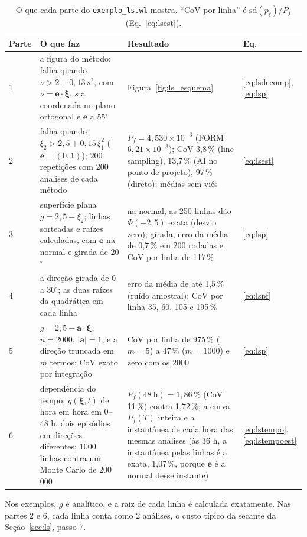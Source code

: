 \documentclass[11pt,a4paper]{article}
\newcommand{\xib}{\bm\xi}
\begin{document}
\begin{table}[H]\centering\small
\caption{O que cada parte do \texttt{exemplo\_ls.wl} mostra. ``CoV por linha'' é $\mathrm{sd}(p_\ell)/P_f$
(Eq.~\ref{eq:lsest}).}\label{tab:exls}
\begin{tabular}{p{}p{}p{}p{}}
\toprule
Parte & O que faz & Resultado & Eq. \\
\midrule
1 & a figura do método: falha quando $\nu > 2 + 0{,}13\,s^2$, com $\nu = \bm e\cdot\xib$, $s$ a coordenada no plano
  ortogonal e $\bm e$ a 55$^\circ$ & Figura~\ref{fig:ls_esquema} & \eqref{eq:lsdecomp},
  \eqref{eq:lsp} \\
2 & falha quando $\xi_2 > 2{,}5 + 0{,}15\,\xi_1^2$ ($\bm e = (0, 1)$); 200 repetições com 200 análises de cada
  método & $P_f = 4{,}530\times
  10^{-3}$ (FORM $6{,}21\times10^{-3}$); CoV 3,8\,\% (line sampling), 13,7\,\% (AI no ponto de projeto), 97\,\% (direto);
  médias sem viés & \eqref{eq:lsest} \\
3 & superfície plana $g = 2{,}5 - \xi_2$; linhas sorteadas e raízes calculadas, com $\bm e$ na normal e girada de
  20$^\circ$ & na normal, as 250 linhas dão $\Phi(-2{,}5)$ exata (desvio zero); girada, erro da média de 0,7\,\% em 200
  rodadas e CoV por linha de 117\,\% & \eqref{eq:lsp} \\
4 & a direção girada de 0 a 30$^\circ$; as duas raízes da quadrática em cada linha & erro da média de até 1,5\,\%
  (ruído amostral); CoV por linha 35, 60, 105 e 195\,\% & \eqref{eq:lspf} \\
5 & $g = 2{,}5 - \bm a\cdot\xib$, $n = 2000$, $|\bm a| = 1$, e a direção truncada em $m$ termos; CoV exato por integração
  & CoV por linha de 975\,\% ($m = 5$) a 47\,\% ($m = 1000$) e zero com os 2000 & \eqref{eq:lsp} \\
6 & dependência do tempo: $g(\xib, t)$ de hora em hora em 0--48 h, dois episódios em direções diferentes; 1000 linhas
  contra um Monte Carlo de 200\,000 & $P_f(48\ \mathrm h) = 1{,}86\,\%$ (CoV 11\,\%) contra 1,72\,\%; a curva $P_f(T)$
  inteira e a instantânea de cada hora das mesmas análises (às 36 h, a instantânea pelas linhas é a exata, 1,07\,\%,
  porque $\bm e$ é a normal desse instante) & \eqref{eq:lstempo}, \eqref{eq:lstempoest} \\
\bottomrule
\end{tabular}
\end{table}
Nos exemplos, $g$ é analítico, e a raiz de cada linha é calculada exatamente. Nas partes 2 e 6, cada linha conta como 2
análises, o custo típico da secante da Seção~\ref{sec:ls}, passo 7.
\end{document}
